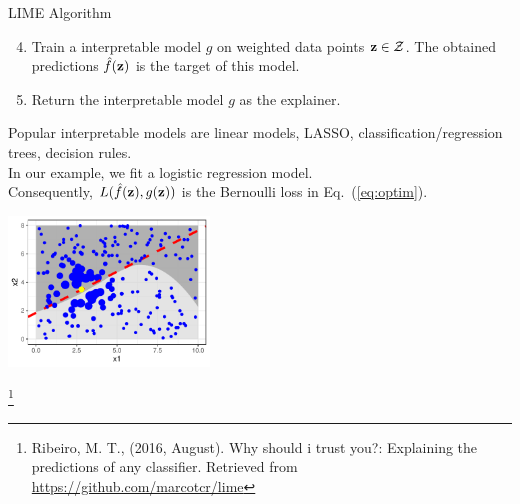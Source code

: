 \documentclass[11pt,compress,t,notes=noshow, xcolor=table]{beamer}
\begin{document}
\begin{vbframe}{LIME Algorithm}
		\framebreak
		\begin{enumerate}
			\setcounter{enumi}{3}
		\item Train a interpretable model $g$ on weighted data points $\zv \in \Zspace$. The obtained predictions $\fh(\zv)$ is the target of this model.
		\item Return the interpretable model $g$ as the explainer. \\[0.3cm]
			\end{enumerate}
		Popular interpretable models are linear models, LASSO, classification/regression trees, decision rules. \\
		In our example, we fit a logistic regression model. \\Consequently, $L(\fh(\zv), g(\zv))$  is the Bernoulli loss in Eq.~(\ref{eq:optim}). 
		\begin{center}
			\includegraphics[width=0.4\textwidth]{figure/lime5}
		\end{center}
		\footnote[frame]{Ribeiro, M. T., (2016, August). Why should i trust you?: Explaining the predictions of any classifier. Retrieved from \url{https://github.com/marcotcr/lime}}
\end{vbframe}
\end{document}
